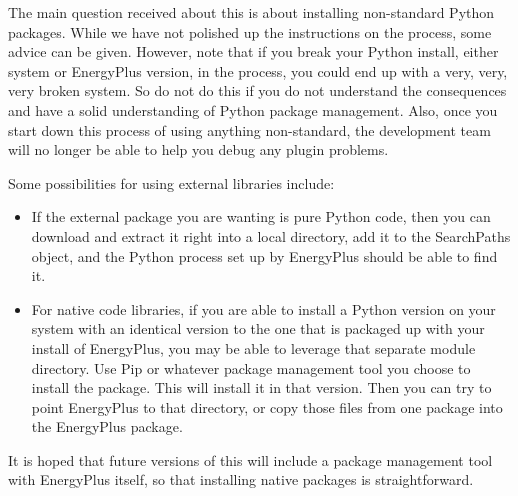 The main question received about this is about installing non-standard Python packages.
While we have not polished up the instructions on the process, some advice can be given.
However, note that if you break your Python install, either system or EnergyPlus version, in the process, you could end up with a very, very, very broken system.
So do not do this if you do not understand the consequences and have a solid understanding of Python package management.
Also, once you start down this process of using anything non-standard, the development team will no longer be able to help you debug any plugin problems.

Some possibilities for using external libraries include:
\begin{itemize}
    \item If the external package you are wanting is pure Python code, then you can download and extract it right into a local directory, add it to the SearchPaths object, and the Python process set up by EnergyPlus should be able to find it.
    \item For native code libraries, if you are able to install a Python version on your system with an identical version to the one that is packaged up with your install of EnergyPlus, you may be able to leverage that separate module directory.
          Use Pip or whatever package management tool you choose to install the package.
          This will install it in that version.
          Then you can try to point EnergyPlus to that directory, or copy those files from one package into the EnergyPlus package.
\end{itemize}

It is hoped that future versions of this will include a package management tool with EnergyPlus itself, so that installing native packages is straightforward.
